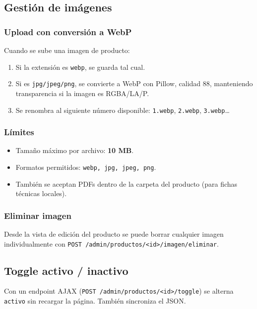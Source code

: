 \documentclass[11pt,a4paper]{article}
\begin{document}
\subsection{Gestión de imágenes}

\subsubsection{Upload con conversión a WebP}

Cuando se sube una imagen de producto:

\begin{enumerate}[leftmargin=*]
    \item Si la extensión es \texttt{webp}, se guarda tal cual.
    \item Si es \texttt{jpg/jpeg/png}, se convierte a WebP con Pillow,
        calidad 88, manteniendo transparencia si la imagen es RGBA/LA/P.
    \item Se renombra al siguiente número disponible: \texttt{1.webp},
        \texttt{2.webp}, \texttt{3.webp}\ldots
\end{enumerate}

\subsubsection{Límites}
\begin{itemize}[leftmargin=*]
    \item Tamaño máximo por archivo: \textbf{10 MB}.
    \item Formatos permitidos: \texttt{webp, jpg, jpeg, png}.
    \item También se aceptan PDFs dentro de la carpeta del producto (para
        fichas técnicas locales).
\end{itemize}

\subsubsection{Eliminar imagen}
Desde la vista de edición del producto se puede borrar cualquier imagen
individualmente con \texttt{POST /admin/productos/<id>/imagen/eliminar}.

\subsection{Toggle activo / inactivo}

Con un endpoint AJAX (\texttt{POST /admin/productos/<id>/toggle}) se
alterna \texttt{activo} sin recargar la página. También sincroniza el
JSON.
\end{document}
